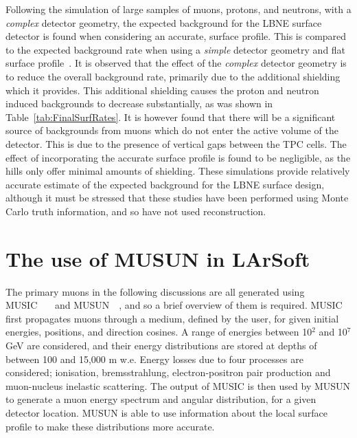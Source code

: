 Following the simulation of large samples of muons, protons, and neutrons, with a \emph{complex} detector geometry, the expected background for the LBNE surface detector is found when considering an accurate, surface profile. This is compared to the expected background rate when using a \emph{simple} detector geometry and flat surface profile~\citep{MartinsThesis}. It is observed that the effect of the \emph{complex} detector geometry is to reduce the overall background rate, primarily due to the additional shielding which it provides. This additional shielding causes the proton and neutron induced backgrounds to decrease substantially, as was shown in Table~\ref{tab:FinalSurfRates}. It is however found that there will be a significant source of backgrounds from muons which do not enter the active volume of the detector. This is due to the presence of vertical gaps between the TPC cells. The effect of incorporating the accurate surface profile is found to be negligible, as the hills only offer minimal amounts of shielding. These simulations provide relatively accurate estimate of the expected background for the LBNE surface design, although it must be stressed that these studies have been performed using Monte Carlo truth information, and so have not used reconstruction. \\

\section{The use of MUSUN in LArSoft} \label{sec:FDIncorporation}  %
The primary muons in the following discussions are all generated using MUSIC~\citep{MUSUN}~\citep{MUSIC}~\citep{MUSIC2} and MUSUN~\citep{MUSUN}~\citep{MUSUN2}, and so a brief overview of them is required. MUSIC first propagates muons through a medium, defined by the user, for given initial energies, positions, and direction cosines. A range of energies between 10$^2$ and 10$^7$ GeV are considered, and their energy distributions are stored at depths of between 100 and 15,000 m w.e. Energy losses due to four processes are considered; ionisation, bremsstrahlung, electron-positron pair production and muon-nucleus inelastic scattering. The output of MUSIC is then used by MUSUN to generate a muon energy spectrum and angular distribution, for a given detector location. MUSUN is able to use information about the local surface profile to make these distributions more accurate. \\

